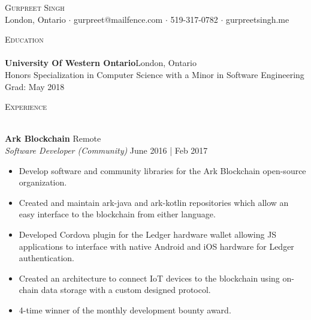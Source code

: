 \documentclass[a4paper]{article}
\newcommand{\lineunder} {
    \vspace*{-8pt} \\
    \hspace*{-18pt} \hrulefill \\
}
\newcommand{\header} [1] {
    {\hspace*{-18pt}\vspace*{6pt} \textsc{#1}}
    \vspace*{-6pt} \lineunder
}
\begin{document}
\vspace*{-40pt}

\vspace*{-10pt}
\begin{center}
	{\Huge \scshape {Gurpreet Singh}}\\
	London, Ontario $\cdot$ gurpreet@mailfence.com $\cdot$ 519-317-0782 $\cdot$ gurpreetsingh.me\\
\end{center}

\vspace*{2mm}

\header{Education}
\textbf{University Of Western Ontario}\hfill London, Ontario\\
Honors Specialization in Computer Science with a Minor in Software Engineering \hfill Grad: May 2018\\
\vspace{2mm}

\vspace*{2mm}

\header{Experience}
\vspace{1mm}

\textbf{Ark Blockchain} \hfill Remote\\
\textit{Software Developer (Community)} \hfill June 2016 | Feb 2017\\
\vspace{-1mm}
\begin{itemize} \itemsep 1pt
	\item Develop software and community libraries for the Ark Blockchain open-source organization.
	\item Created and maintain ark-java and ark-kotlin repositories which allow an easy interface to the blockchain from either language.
    \item Developed Cordova plugin for the Ledger hardware wallet allowing JS applications to interface with native Android and iOS hardware for Ledger authentication.
    \item Created an architecture to connect IoT devices to the blockchain using on-chain data storage with a custom designed protocol.\\
    \item 4-time winner of the monthly development bounty award.
\end{itemize}
\end{document}
